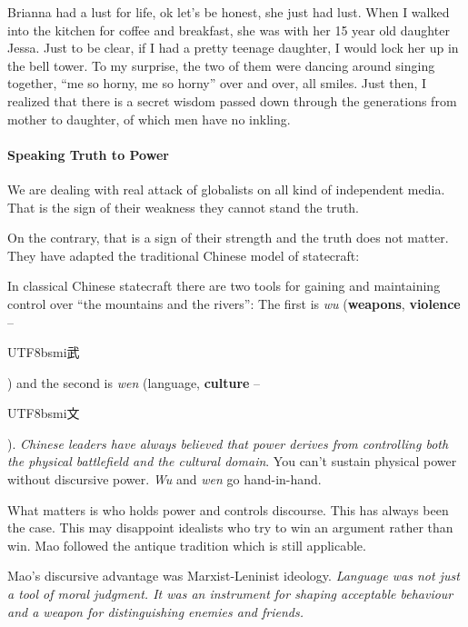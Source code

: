 \begin{quotex}
Brianna had a lust for life, ok let's be honest, she just had lust. When I walked into the kitchen for coffee and breakfast, she was with her 15 year old daughter Jessa. Just to be clear, if I had a pretty teenage daughter, I would lock her up in the bell tower. To my surprise, the two of them were dancing around singing together, ``me so horny, me so horny'' over and over, all smiles. Just then, I realized that there is a secret wisdom passed down through the generations from mother to daughter, of which men have no inkling.
\end{quotex}


\paragraph{Speaking Truth to Power}


\begin{quotex}
We are dealing with real attack of globalists on all kind of independent media. That is the sign of their weakness they cannot stand the truth.
\end{quotex}


On the contrary, that is a sign of their strength and the truth does not matter. They have adapted the traditional Chinese model of statecraft:

\begin{quotex}
In classical Chinese statecraft there are two tools for gaining and maintaining control over ``the mountains and the rivers'': The first is \emph{wu} (\textbf{weapons}, \textbf{violence} -- \begin{CJK*}{UTF8}{bsmi}武\end{CJK*}) and the second is \emph{wen} (language, \textbf{culture} -- \begin{CJK*}{UTF8}{bsmi}文\end{CJK*}). \emph{Chinese leaders have always believed that power derives from controlling both the physical battlefield and the cultural domain}. You can't sustain physical power without discursive power. \emph{Wu} and \emph{wen} go hand-in-hand.
\end{quotex}


What matters is who holds power and controls discourse. This has always been the case. This may disappoint idealists who try to win an argument rather than win. Mao followed the antique tradition which is still applicable.

\begin{quotex}
Mao's discursive advantage was Marxist-Leninist ideology. \emph{Language was not just a tool of moral judgment. It was an instrument for shaping acceptable behaviour and a weapon for distinguishing enemies and friends.}
\end{quotex}


